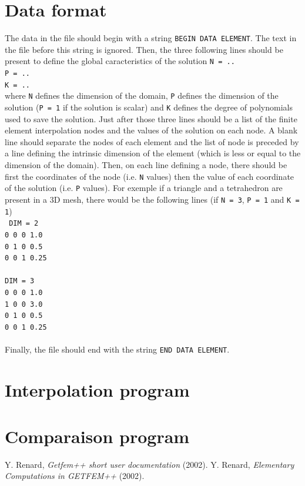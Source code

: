 \documentclass[11pt,a4paper]{article}
\begin{document}
\newpage
\tableofcontents
\newpage

\section{Data format}
The data in the file should begin with a string {\tt BEGIN DATA ELEMENT}. The text in the file before this string is ignored. Then, the three following lines should be present to define the global caracteristics of the solution
{\tt N = ..\\
  P = ..\\
  K = ..\\
}
where {\tt N} defines the dimension of the domain, {\tt P} defines the dimension of the solution ({\tt P = 1} if the solution is scalar) and {\tt K} defines the degree of polynomials used to save the solution. Just after those three lines should be a list of the finite element interpolation nodes and the values of the solution on each node. A blank line should separate the nodes of each element and the list of node is preceded by a line defining the intrinsic dimension of the element (which is less or equal to the dimension of the domain). Then, on each line defining a node, there should be first the coordinates of the node (i.e. {\tt N} values) then the value of each coordinate of the solution (i.e. {\tt P} values). For exemple if a triangle and a tetrahedron are present in a 3D mesh, there would be the following lines (if {\tt N = 3}, {\tt P = 1} and {\tt K = 1})\\[0.5cm]
{\tt 
  DIM = 2 \\
  0 0 0 1.0 \\
  0 1 0 0.5 \\
  0 0 1 0.25 \\
  \\
  DIM = 3 \\
  0 0 0 1.0 \\
  1 0 0 3.0 \\
  0 1 0 0.5 \\
  0 0 1 0.25 \\
  \\
}
Finally, the file should end with the string {\tt END DATA ELEMENT}.

\section{Interpolation program}
\section{Comparaison program}



\begin{thebibliography}{99}
% 
% 
% 
  Y. {\sc Renard},
  {\it Getfem++ short user documentation} (2002).
  Y. {\sc Renard},
  {\it Elementary Computations in GETFEM++} (2002).
\end{thebibliography}
\end{document}

